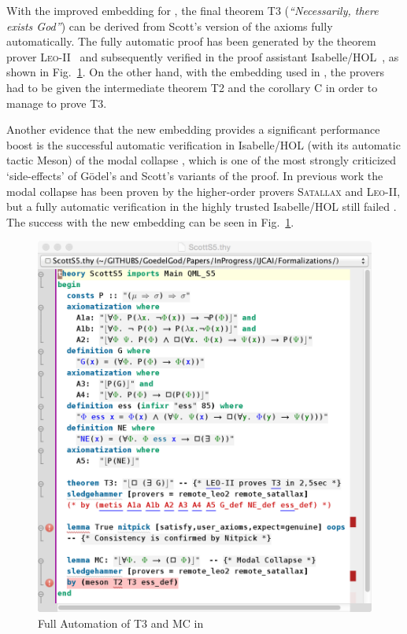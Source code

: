 \documentclass{article}
\begin{document}
With the improved embedding for \SFiveU, the final theorem T3 (\textit{``Necessarily, there
exists God''}) can be derived from Scott's version of the axioms fully automatically. 
The fully automatic proof has been generated by the theorem prover \textsc{Leo-II}~\cite{C26} 
and subsequently verified in the proof assistant Isabelle/HOL~\cite{NPW02}, as shown in Fig.~\ref{ScottS5}. 
On the other hand, with the embedding used in , 
the provers had to be given the intermediate theorem T2 and the corollary C in order to manage to prove T3. 

Another evidence that the new embedding provides a significant performance boost 
is the successful automatic verification in Isabelle/HOL (with its automatic tactic Meson) of the modal
collapse \cite{Sobel}, which is one of the most strongly criticized
`side-effects' of G\"odel's and Scott's variants of the proof. In previous work 
the modal collapse has been proven by the higher-order provers
\textsc{Satallax} \cite{Satallax} and \textsc{Leo-II}, but a fully automatic
verification in the highly trusted Isabelle/HOL still failed \cite{ArchiveFormalProofsGoedelGod}. The success with the new embedding can be seen in Fig.~\ref{ScottS5}.

\begin{figure}
\centerline{\includegraphics[width=\columnwidth]{./Images/ScottS5.png}}
\caption{Full Automation of T3 and MC in \SFiveU } \label{ScottS5}
\end{figure}
\end{document}
